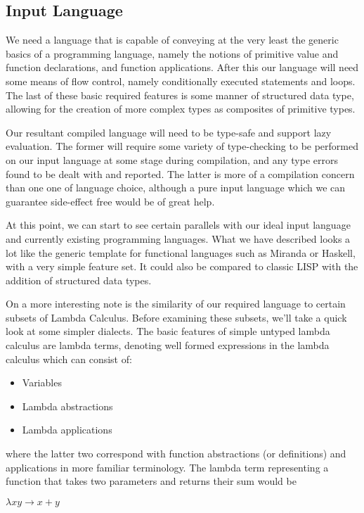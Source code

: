 \subsection{Input Language}
We need a language that is capable of conveying at the very least the generic basics 
of a programming language, namely the notions of primitive value and function
declarations, and function applications. After this our language will need
some means of flow control, namely conditionally executed statements and 
loops. The last of these basic required features is some manner of structured
data type, allowing for the creation of more complex types as composites of
primitive types. 

Our resultant compiled language will need to be type-safe and support lazy
evaluation. The former will require some variety of type-checking to be 
performed on our input language at some stage during compilation, and any
type errors found to be dealt with and reported. The latter is more of a 
compilation concern than one one of language choice, although a pure input
language which we can guarantee side-effect free would be of great help.

At this point, we can start to see certain parallels with our ideal input
language and currently existing programming languages. What we have described
looks a lot like the generic template for functional languages such as Miranda
or Haskell, with a very simple feature set. It could also be compared to 
classic LISP with the addition of structured data types. 

On a more interesting note is the similarity of our required language to
certain subsets of Lambda Calculus. Before examining these subsets, we'll
take a quick look at some simpler dialects. The basic
features of simple untyped lambda calculus are lambda terms, denoting well 
formed expressions in the lambda calculus which can consist of:

\begin{itemize}
\item Variables
\item Lambda abstractions
\item Lambda applications
\end{itemize}

\noindent where the latter two correspond with function abstractions (or
definitions) and applications in more familiar terminology. The lambda term
representing a function that takes two parameters and returns their sum 
would be 

\begin{center} 
	\( \lambda x y \rightarrow x + y \)
\end{center}

